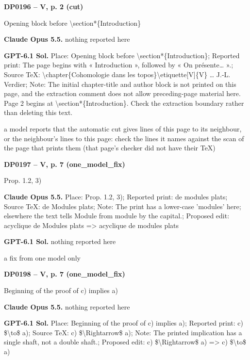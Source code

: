 \par\noindent\hypertarget{DP0196}{}\textbf{DP0196 -- V, p. 2 (cut)}\par
Opening block before \textbackslash{}section*\{Introduction\}\par
\textbf{Claude Opus 5.5.} nothing reported here\par
\textbf{GPT-6.1 Sol.} Place: Opening block before \textbackslash{}section*\{Introduction\}; Reported print: The page begins with « Introduction », followed by « On présente… ».; Source TeX: \textbackslash{}chapter\{Cohomologie dans les topos\}\textbackslash{}etiquette[V]\{V\} … J.-L. Verdier; Note: The initial chapter-title and author block is not printed on this page, and the extraction comment does not allow preceding-page material here. Page 2 begins at \textbackslash{}section*\{Introduction\}. Check the extraction boundary rather than deleting this text.\par
a model reports that the automatic cut gives lines of this page to its neighbour, or the neighbour's lines to this page: check the lines it names against the scan of the page that prints them (that page's checker did not have their TeX)\par
\par\noindent\hypertarget{DP0197}{}\textbf{DP0197 -- V, p. 7 (one\_model\_fix)}\par
Prop. 1.2, 3)\par
\textbf{Claude Opus 5.5.} Place: Prop. 1.2, 3); Reported print: de modules plats; Source TeX: de Modules plats; Note: The print has a lower-case 'modules' here; elsewhere the text tells Module from module by the capital.; Proposed edit: acyclique de Modules plats =\allowbreak > acyclique de modules plats\par
\textbf{GPT-6.1 Sol.} nothing reported here\par
a fix from one model only\par
\par\noindent\hypertarget{DP0198}{}\textbf{DP0198 -- V, p. 7 (one\_model\_fix)}\par
Beginning of the proof of c) implies a)\par
\textbf{Claude Opus 5.5.} nothing reported here\par
\textbf{GPT-6.1 Sol.} Place: Beginning of the proof of c) implies a); Reported print: c) \$\textbackslash{}to\$ a); Source TeX: c) \$\textbackslash{}Rightarrow\$ a); Note: The printed implication has a single shaft, not a double shaft.; Proposed edit: c) \$\textbackslash{}Rightarrow\$ a) =\allowbreak > c) \$\textbackslash{}to\$ a)\par

